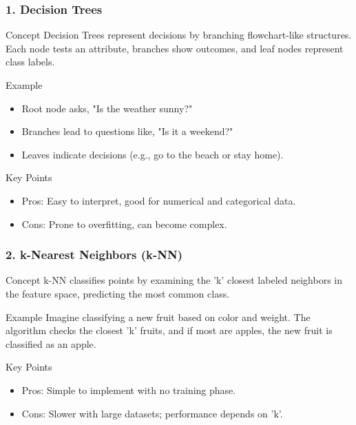 \documentclass[aspectratio=169]{beamer}
\begin{document}
\begin{frame}[fragile]
    \frametitle{1. Decision Trees}
    \begin{block}{Concept}
        Decision Trees represent decisions by branching flowchart-like structures. Each node tests an attribute, branches show outcomes, and leaf nodes represent class labels.
    \end{block}
    
    \begin{block}{Example}
        \begin{itemize}
            \item Root node asks, "Is the weather sunny?"
            \item Branches lead to questions like, "Is it a weekend?"
            \item Leaves indicate decisions (e.g., go to the beach or stay home).
        \end{itemize}
    \end{block}
    
    \begin{block}{Key Points}
        \begin{itemize}
            \item Pros: Easy to interpret, good for numerical and categorical data.
            \item Cons: Prone to overfitting, can become complex.
        \end{itemize}
    \end{block}
\end{frame}

\begin{frame}[fragile]
    \frametitle{2. k-Nearest Neighbors (k-NN)}
    \begin{block}{Concept}
        k-NN classifies points by examining the 'k' closest labeled neighbors in the feature space, predicting the most common class.
    \end{block}
    
    \begin{block}{Example}
        Imagine classifying a new fruit based on color and weight. The algorithm checks the closest 'k' fruits, and if most are apples, the new fruit is classified as an apple.
    \end{block}
    
    \begin{block}{Key Points}
        \begin{itemize}
            \item Pros: Simple to implement with no training phase.
            \item Cons: Slower with large datasets; performance depends on 'k'.
        \end{itemize}
    \end{block}
\end{frame}
\end{document}
